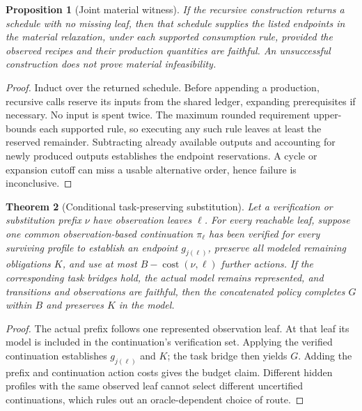 \documentclass[11pt]{article}
\newtheorem{theorem}{Theorem}[section]
\newtheorem{proposition}[theorem]{Proposition}
\theoremstyle{definition}
\newcommand{\cost}{\operatorname{cost}}
\begin{document}
\begin{proposition}[Joint material witness]
If the recursive construction returns a schedule with no missing leaf, then
that schedule supplies the listed endpoints in the material relaxation, under
each supported consumption rule, provided the observed recipes and their
production quantities are faithful. An unsuccessful construction does not prove
material infeasibility.
\end{proposition}
\begin{proof}
Induct over the returned schedule. Before appending a production, recursive calls
reserve its inputs from the shared ledger, expanding prerequisites if necessary.
No input is spent twice. The maximum rounded requirement upper-bounds each
supported rule, so executing any such rule leaves at least the reserved
remainder. Subtracting already available outputs and accounting for newly
produced outputs establishes the endpoint reservations. A cycle or expansion
cutoff can miss a usable alternative order, hence failure is inconclusive.
\end{proof}

\begin{theorem}[Conditional task-preserving substitution]
\label{thm:task-substitution}
Let a verification or substitution prefix $\nu$ have observation leaves $\ell$.
For every reachable leaf, suppose one common observation-based continuation
$\pi_\ell$ has been verified for every surviving profile to establish an endpoint
$g_{j(\ell)}$, preserve all modeled remaining obligations $K$, and use at most
$B-\cost(\nu,\ell)$ further actions. If the corresponding task bridges hold,
the actual model remains represented, and transitions and observations are
faithful, then the concatenated policy completes $G$ within $B$ and preserves
$K$ in the model.
\end{theorem}
\begin{proof}
The actual prefix follows one represented observation leaf. At that leaf its
model is included in the continuation's verification set. Applying the verified
continuation establishes $g_{j(\ell)}$ and $K$; the task bridge then yields $G$.
Adding the prefix and continuation action costs gives the budget claim. Different
hidden profiles with the same observed leaf cannot select different uncertified
continuations, which rules out an oracle-dependent choice of route.
\end{proof}
\end{document}

